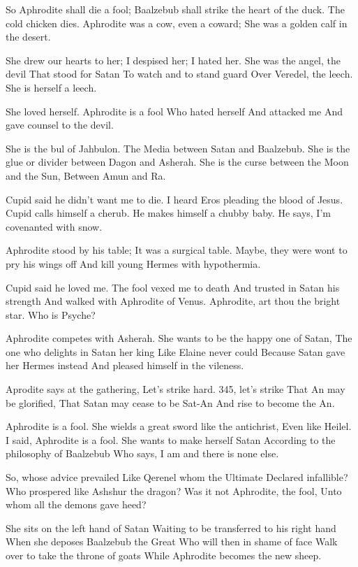 \documentclass[
]{book}
\begin{document}
So Aphrodite shall die a fool;
Baalzebub shall strike the heart of the duck.
The cold chicken dies.
Aphrodite was a cow, even a coward;
She was a golden calf in the desert.

She drew our hearts to her;
I despised her; I hated her.
She was the angel, the devil
That stood for Satan
To watch and to stand guard
Over Veredel, the leech.
She is herself a leech.

She loved herself.
Aphrodite is a fool
Who hated herself
And attacked me
And gave counsel to the devil.

She is the bul of Jahbulon.
The Media between Satan and Baalzebub.
She is the glue or divider between Dagon and Asherah.
She is the curse between the Moon and the Sun,
Between Amun and Ra.

Cupid said he didn't want me to die.
I heard Eros pleading the blood of Jesus.
Cupid calls himself a cherub.
He makes himself a chubby baby.
He says, I'm covenanted with snow.

Aphrodite stood by his table;
It was a surgical table.
Maybe, they were wont to pry his wings off
And kill young Hermes with hypothermia.

Cupid said he loved me.
The fool vexed me to death
And trusted in Satan his strength
And walked with Aphrodite of Venus.
Aphrodite, art thou the bright star.
Who is Psyche?

Aphrodite competes with Asherah.
She wants to be the happy one of Satan,
The one who delights in Satan her king
Like Elaine never could
Because Satan gave her Hermes instead
And pleased himself in the vileness.

Aprodite says at the gathering,
Let's strike hard.
345, let's strike
That An may be glorified,
That Satan may cease to be Sat-An
And rise to become the An.

Aphrodite is a fool.
She wields a great sword like the antichrist,
Even like Heilel.
I said, Aphrodite is a fool.
She wants to make herself Satan
According to the philosophy of Baalzebub
Who says, I am and there is none else.

So, whose advice prevailed
Like Qerenel whom the Ultimate
Declared infallible?
Who prospered like Ashshur the dragon?
Was it not Aphrodite, the fool,
Unto whom all the demons gave heed?

She sits on the left hand of Satan
Waiting to be transferred to his right hand
When she deposes Baalzebub the Great
Who will then in shame of face
Walk over to take the throne of goats
While Aphrodite becomes the new sheep.
\end{document}
